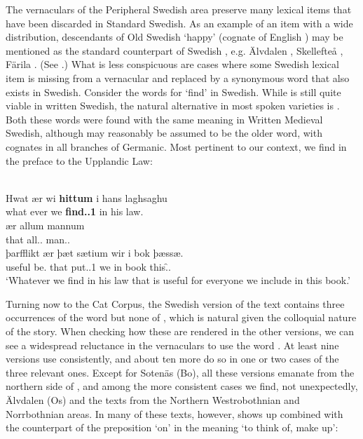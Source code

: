 The vernaculars of the Peripheral Swedish area preserve many lexical items that have been discarded in Standard Swedish. As an example of an item with a wide distribution, descendants of Old Swedish ‘happy’ (cognate of English ) may be mentioned as the standard counterpart of Swedish , e.g. Älvdalen , Skellefteå , Färila . (See .) What is less conspicuous are cases where some Swedish lexical item is missing from a vernacular and replaced by a synonymous word that also exists in Swedish. Consider the words for ‘find’ in Swedish. While is still quite viable in written Swedish, the natural alternative in most spoken varieties is . Both these words were found with the same meaning in Written Medieval Swedish, although  may reasonably be assumed to be the older word, with cognates in all branches of Germanic. Most pertinent to our context, we find  in the preface to the Upplandic Law:

\ea\label{}
\\
\gll Hwat  ær  wi  \textbf{hittum} i  hans  laghsaghu\\
what  ever  we  \textbf{find.{\prs}.1{\pl}} in  his  law.{\dat}\\
\gll ær  allum  mannum\\
that  all.{\dat}.{\pl}  man.{\dat}.{\pl}\\
\gll þarfflikt  ær  þæt  sætium  wir  i  bok  þæssæ.\\
useful  be.{\prs}  that  put.{\prs}.1{\pl}  we  in  book  this.{\f}.{\acc}\\
\glt ‘Whatever we find in his law that is useful for everyone we include in this book.’
\z

Turning now to the Cat Corpus, the Swedish version of the text contains three occurrences of the word  but none of , which is natural given the colloquial nature of the story. When checking how these are rendered in the other versions, we can see a widespread reluctance in the vernaculars to use the word . At least nine versions use  consistently, and about ten more do so in one or two cases of the three relevant ones. Except for Sotenäs (Bo), all these versions emanate from the northern side of , and among the more consistent cases we find, not unexpectedly, Älvdalen (Os) and the texts from the Northern Westrobothnian and Norrbothnian areas. In many of these texts, however,  shows up combined with the counterpart of the preposition  ‘on’ in the meaning ‘to think of, make up’:

